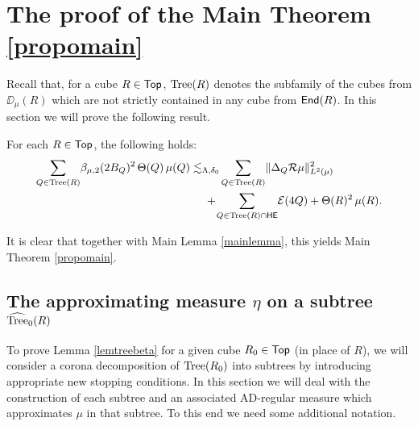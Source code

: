 
\section{The proof of the Main Theorem \ref{propomain}} \label{sec9}

Recall that, for a cube $R\in{\mathsf {Top}}$, ${\rm Tree}(R)$ denotes the subfamily of the cubes from $\DD_\mu(R)$ which are not strictly contained in any cube
from ${\mathsf{End}}(R)$.
In this section we will prove the following result. 

\begin{lemma}\label{lemtreebeta}
For each $R\in{\mathsf {Top}}$, the following holds:
\begin{align*}
\sum_{Q\in{\rm Tree}(R)} \!\beta_{\mu,2}(2B_Q)^2\,\Theta(Q)\,\mu(Q) & \lesssim_{\Lambda,\delta_0}\!\sum_{Q\in{\rm Tree}(R)}\!\|\Delta_Q{\mathcal R}\mu\|_{L^2(\mu)}^2\\&\quad \;+ \!\sum_{Q\in{\rm Tree}(R)\cap{\mathsf {HE}}}\! {\mathcal E}(4Q) +\Theta(R)^2\,\mu(R).
\end{align*}
\end{lemma}

It is clear that together with Main Lemma \ref{mainlemma}, this yields Main
Theorem \ref{propomain}.



\vv
\subsection{The approximating measure \texorpdfstring{$\eta$}{eta} on a subtree \texorpdfstring{${\widehat{{\rm Tree}}}_0(R)$}{Tree\_0(R)}}\label{subsec:91}

To prove Lemma \ref{lemtreebeta} for a given cube $R_0\in{\mathsf {Top}}$ (in place of $R$), we will consider a corona 
decomposition of ${\rm Tree}(R_0)$ into subtrees by introducing appropriate new stopping conditions. 
In this section we will deal with the construction of each subtree and an associated AD-regular measure
which approximates $\mu$ in that subtree.
To this end we need some additional notation. 

